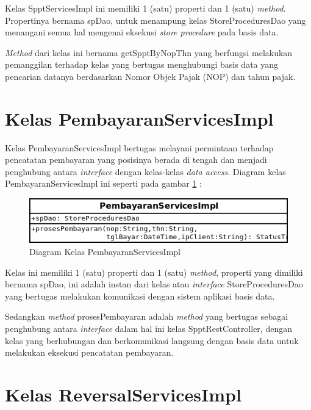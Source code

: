 Kelas SpptServicesImpl ini memiliki 1 (satu) properti dan 1 (satu) \textit{method}. Propertinya bernama spDao, untuk menampung kelas StoreProceduresDao yang menangani semua hal mengenai eksekusi \textit{store procedure} pada basis data.

\textit{Method} dari kelas ini bernama getSpptByNopThn yang berfungsi melakukan pemanggilan terhadap kelas yang bertugas menghubungi basis data yang pencarian datanya berdasarkan Nomor Objek Pajak (NOP) dan tahun pajak.

\section{Kelas PembayaranServicesImpl}

Kelas PembayaranServicesImpl bertugas melayani permintaan terhadap pencatatan pembayaran yang posisinya berada di tengah dan menjadi penghubung antara \textit{interface} dengan kelas-kelas \textit{data access}. Diagram kelas PembayaranServicesImpl ini seperti pada gambar \ref{fig:uml-class-PembayaranServicesImpl} :

\begin{figure}[H]
  \centering
  \includegraphics[width=1\textwidth]{./resources/uml/uml-class-PembayaranServicesImpl}
  \caption{Diagram Kelas PembayaranServicesImpl}
  \label{fig:uml-class-PembayaranServicesImpl}
\end{figure}

Kelas ini memiliki 1 (satu) properti dan 1 (satu) \textit{method}, properti yang dimiliki bernama spDao, ini adalah instan dari kelas atau \textit{interface} StoreProceduresDao yang bertugas melakukan komunikasi dengan sistem aplikasi basis data.

Sedangkan \textit{method} prosesPembayaran adalah \textit{method} yang bertugas sebagai penghubung antara \textit{interface} dalam hal ini kelas SpptRestController, dengan kelas yang berhubungan dan berkomunikasi langsung dengan basis data untuk melakukan eksekusi pencatatan pembayaran.

\section{Kelas ReversalServicesImpl}

